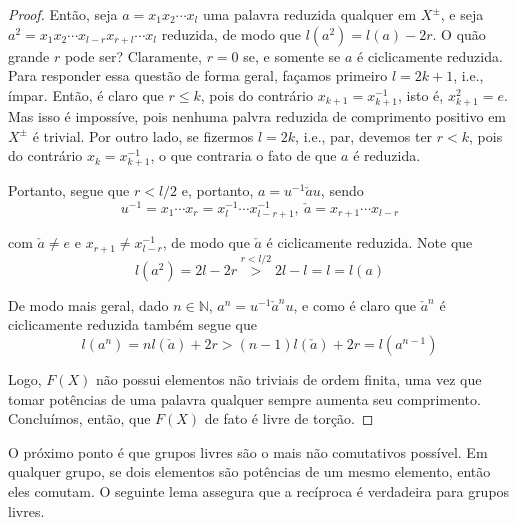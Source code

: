 	\begin{proof} Então, seja $a = x_1x_2\cdots x_l$ uma palavra reduzida qualquer em $X^{\pm}$, e seja $a^2 = x_1x_2\cdots x_{l-r}x_{r+l}\cdots x_l$ reduzida, de modo que $l(a^2) = l(a) - 2r$. O quão grande $r$ pode ser? Claramente, $r=0$ se, e somente se $a$ é ciclicamente reduzida. Para responder essa questão de forma geral, façamos primeiro $l = 2k + 1$, i.e., ímpar. Então, é claro que $r\leq k$, pois do contrário $x_{k+1} = x_{k+1}^{-1}$, isto é, $x_{k+1}^2 = e$. Mas isso é impossíve, pois  nenhuma palvra reduzida de comprimento positivo em $X^{\pm}$ é trivial. Por outro lado, se fizermos $l = 2k$, i.e., par, devemos ter $r<k$, pois do contrário $x_k = x_{k+1}^{-1}$, o que contraria o fato de que $a$ é reduzida. 
		\par\vspace{0.3cm} Portanto, segue que $r< l/2$ e, portanto, $a = u^{-1}\check{a}u$, sendo
		\begin{equation*}
		u^{-1} = x_1\cdots x_r = x_l^{-1}\cdots x_{l-r+1}^{-1}, \ \check{a} = x_{r+1}\cdots x_{l-r}
		\end{equation*}
		\par\vspace{0.3cm} com $\check{a}\neq e$ e $x_{r+1}\neq x_{l-r}^{-1}$, de modo que $\check{a}$ é ciclicamente reduzida. Note que 
		\begin{equation*}
		l(a^2) = 2l - 2r \stackrel{r<l/2}{>} 2l - l = l = l(a)
		\end{equation*}
		\par\vspace{0.3cm} De modo mais geral, dado $n\in\mathbb{N}$, $a^n = u^{-1}\check{a}^nu$, e como é claro que $\check{a}^n$ é ciclicamente reduzida também segue que 
		\begin{equation}
		\label{comprimento de a^n}
		l(a^n) = nl(\check{a}) + 2r > (n-1)l(\check{a}) + 2r = l(a^{n-1})
		\end{equation}
		\par\vspace{0.3cm} Logo, $F(X)$ não possui elementos não triviais de ordem finita, uma vez que tomar potências de uma palavra qualquer sempre aumenta seu comprimento. Concluímos, então, que $F(X)$ de fato é livre de torção.
	\end{proof}
	\par\vspace{0.3cm} O próximo ponto é que grupos livres são o mais não comutativos possível. Em qualquer grupo, se dois elementos são potências de um mesmo elemento, então eles comutam. O seguinte lema assegura que a recíproca é verdadeira para grupos livres.
